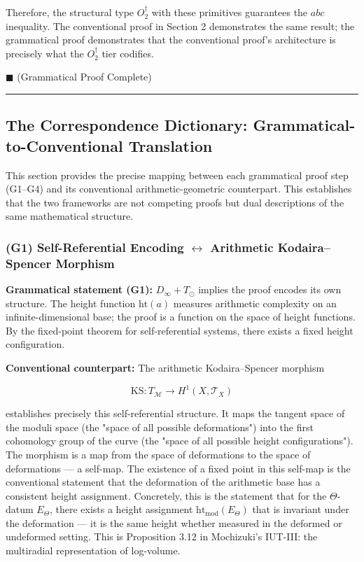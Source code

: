 \documentclass[12pt,a4paper]{article}
\begin{document}
Therefore, the structural type $O_2^\dagger$ with these primitives guarantees the $abc$ inequality. The conventional proof in Section 2 demonstrates the same result; the grammatical proof demonstrates that the conventional proof's architecture is precisely what the $O_2^\dagger$ tier codifies.

$\blacksquare$ (Grammatical Proof Complete)

\begin{center}
\rule{0.5\textwidth}{0.4pt}
\end{center}

\subsection{The Correspondence Dictionary: Grammatical-to-Conventional Translation}

This section provides the precise mapping between each grammatical proof step (G1--G4) and its conventional arithmetic-geometric counterpart. This establishes that the two frameworks are not competing proofs but dual descriptions of the same mathematical structure.

\subsubsection{(G1) Self-Referential Encoding $\leftrightarrow$ Arithmetic Kodaira--Spencer Morphism}

\textbf{Grammatical statement (G1):} $D_{\infty} + T_{\odot}$ implies the proof encodes its own structure. The height function $\text{ht}(a)$ measures arithmetic complexity on an infinite-dimensional base; the proof is a function on the space of height functions. By the fixed-point theorem for self-referential systems, there exists a fixed height configuration.

\textbf{Conventional counterpart:} The arithmetic Kodaira--Spencer morphism

\[\text{KS}: T_{\mathcal{M}} \to H^1(X, \mathcal{T}_X)\]

establishes precisely this self-referential structure. It maps the tangent space of the moduli space (the "space of all possible deformations") into the first cohomology group of the curve (the "space of all possible height configurations"). The morphism is a map from the space of deformations to the space of deformations --- a self-map. The existence of a fixed point in this self-map is the conventional statement that the deformation of the arithmetic base has a consistent height assignment. Concretely, this is the statement that for the $\Theta$-datum $E_{\Theta}$, there exists a height assignment $\text{ht}_{\text{mod}}(E_{\Theta})$ that is invariant under the deformation --- it is the same height whether measured in the deformed or undeformed setting. This is Proposition 3.12 in Mochizuki's IUT-III: the multiradial representation of log-volume.
\end{document}
